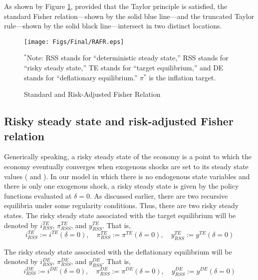 \documentclass[11pt]{article}
\begin{document}
	As shown by Figure \ref{fig:RAFR}, provided that the Taylor principle is satisfied, the standard Fisher relation---shown by the solid blue line---and the truncated Taylor rule---shown by the solid black line---intersect in two distinct locations.
	
	\begin{figure}[!ht]  %
		\begin{center}
			\caption{Standard and Risk-Adjusted Fisher Relation}
			\texttt{[image: Figs/Final/RAFR.eps]}
			\label{fig:RAFR}
		\end{center}
		\scriptsize{$^*$Note: RSS stands for ``deterministic steady state,'' RSS stands for ``risky steady state,'' TE stands for ``target equilibrium,'' and DE stands for ``deflationary equilibrium.'' $\pi^*$ is the inflation target.}
	\end{figure}

	\subsection{Risky steady state and risk-adjusted Fisher relation}
	
	Generically speaking, a risky steady state of the economy is a point to which the economy eventually converges when exogenous shocks are set to its steady state values (\citet{CoeurdacierReyWinant2011} and \citet{HillsNakataSchmidt2016}). In our model in which there is no endogenous state variables and there is only one exogenous shock, a risky steady state is given by the policy functions evaluated at $\delta=0$. As discussed earlier, there are two recursive equilibria under some regularity conditions. Thus, there are two risky steady states. The risky steady state associated with the target equilibrium will be denoted by $i_{RSS}^{TE}$, $\pi_{RSS}^{TE}$, and $y_{RSS}^{TE}$. That is,
	\begin{equation}
	i_{RSS}^{TE} := i^{TE}(\delta=0),\hspace{1em}\pi_{RSS}^{TE} := \pi^{TE}(\delta=0),\hspace{1em}y_{RSS}^{TE} := y^{TE}(\delta=0)
	\end{equation}
	
	\noindent The risky steady state associated with the deflationary equilibrium will be denoted by $i_{RSS}^{DE}$, $\pi_{RSS}^{DE}$, and $y_{RSS}^{DE}$. That is,
	\begin{equation}
	i_{RSS}^{DE} := i^{DE}(\delta=0),\hspace{1em}\pi_{RSS}^{DE} := \pi^{DE}(\delta=0),\hspace{1em}y_{RSS}^{DE} := y^{DE}(\delta=0)
	\end{equation}
	
\end{document}
